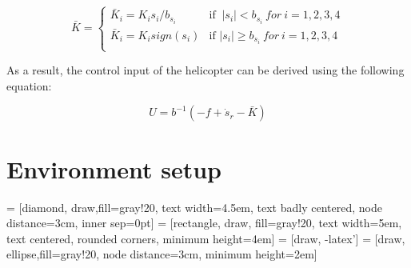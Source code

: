 \begin{equation}
	\bar{K}=
	\left\{
	\begin{array}{ll}
		\bar{K}_i = K_i s_i/b_{s_i} & \mbox{if } \ |s_i|<b_{s_i}\  for\  i=1,2,3,4 \\
		\bar{K}_i = K_i sign(s_i) & \mbox{if } |s_i| \geqslant b_{s_i} \  for\  i= 1,2,3,4\\
	\end{array}
	\right.
\end{equation}

As a result, the control input of the helicopter can be derived using the following equation:

\begin{equation}
	U=b^{-1} (-f+\dot{s}_r-\bar{K})
\end{equation}

\section{Environment setup}

 = [diamond, draw,fill=gray!20, 
text width=4.5em, text badly centered, node distance=3cm, inner sep=0pt]
 = [rectangle, draw, fill=gray!20, 
text width=5em, text centered, rounded corners, minimum height=4em]
 = [draw, -latex']
 = [draw, ellipse,fill=gray!20, node distance=3cm,
minimum height=2em]

